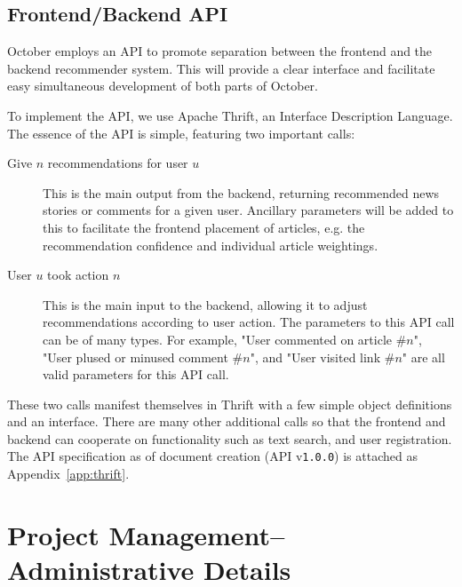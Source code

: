 \documentclass[11pt,letterpaper,titlepage]{article}
\begin{document}
\subsection{Frontend/Backend API}
\label{sec:api}
October employs an API to promote separation between the frontend and the backend recommender system.
This will provide a clear interface and facilitate easy simultaneous development of both parts of October.

To implement the API, we use Apache Thrift, an Interface Description Language\cite{thrift}.
The essence of the API is simple, featuring two important calls:
\begin{description}
\item[Give $n$ recommendations for user $u$]
This is the main output from the backend, returning recommended news stories or comments for a given user.
Ancillary parameters will be added to this to facilitate the frontend placement of articles, e.g. the recommendation confidence and individual article weightings.
\item[User $u$ took action $n$]
This is the main input to the backend, allowing it to adjust recommendations according to user action.
The parameters to this API call can be of many types. For example, "User commented on article \#$n$", "User plused or minused comment \#$n$", and "User visited link \#$n$" are all valid parameters for this API call.
\end{description}

These two calls manifest themselves in Thrift with a few simple object definitions and an interface.
There are many other additional calls so that the frontend and backend can cooperate on functionality such as text search, and user registration.
The API specification as of document creation (API v\texttt{1.0.0}) is attached as Appendix~\ref{app:thrift}.

\section{Project Management--Administrative Details}
\end{document}
